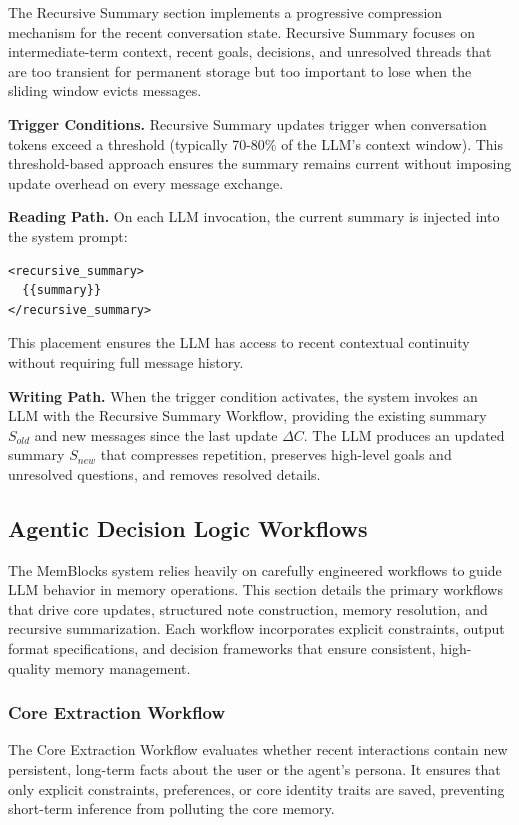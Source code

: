 \documentclass[12pt,a4paper]{article}
\begin{document}
The Recursive Summary section implements a progressive compression mechanism for the recent conversation state. Recursive Summary focuses on intermediate-term context, recent goals, decisions, and unresolved threads that are too transient for permanent storage but too important to lose when the sliding window evicts messages.

\textbf{Trigger Conditions.} Recursive Summary updates trigger when conversation tokens exceed a threshold (typically 70-80\% of the LLM's context window). This threshold-based approach ensures the summary remains current without imposing update overhead on every message exchange.

\textbf{Reading Path.} On each LLM invocation, the current summary is injected into the system prompt:

\begin{verbatim}
<recursive_summary>
  {{summary}}
</recursive_summary>
\end{verbatim}

This placement ensures the LLM has access to recent contextual continuity without requiring full message history.

\textbf{Writing Path.} When the trigger condition activates, the system invokes an LLM with the Recursive Summary Workflow, providing the existing summary $S_{old}$ and new messages since the last update $\Delta C$. The LLM produces an updated summary $S_{new}$ that compresses repetition, preserves high-level goals and unresolved questions, and removes resolved details.

\subsection{Agentic Decision Logic Workflows}

The MemBlocks system relies heavily on carefully engineered workflows to guide LLM behavior in memory operations. This section details the primary workflows that drive core updates, structured note construction, memory resolution, and recursive summarization. Each workflow incorporates explicit constraints, output format specifications, and decision frameworks that ensure consistent, high-quality memory management.

\subsubsection{Core Extraction Workflow}

The Core Extraction Workflow evaluates whether recent interactions contain new persistent, long-term facts about the user or the agent's persona. It ensures that only explicit constraints, preferences, or core identity traits are saved, preventing short-term inference from polluting the core memory.
\end{document}
